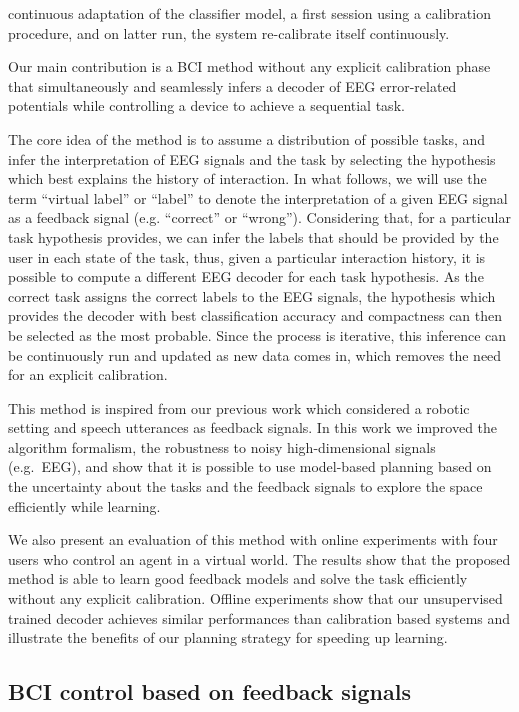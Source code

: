 \cite{schettini2014self} continuous adaptation of the classifier model, a first session using a calibration procedure, and on latter run, the system re-calibrate itself continuously.


Our main contribution is a BCI method without any explicit calibration phase that simultaneously and seamlessly infers a decoder of EEG error-related potentials while controlling a device to achieve a sequential task.

The core idea of the method is to assume a distribution of possible tasks, and infer the interpretation of EEG signals and the task by selecting the hypothesis which best explains the history of interaction. In what follows, we will use the term ``virtual label'' or ``label'' to denote the interpretation of a given EEG signal as a feedback signal (e.g. ``correct'' or ``wrong''). Considering that, for a particular task hypothesis provides, we can infer the labels that should be provided by the user in each state of the task, thus, given a particular interaction history, it is possible to compute a different EEG decoder for each task hypothesis. As the correct task assigns the correct labels to the EEG signals, the hypothesis which provides the decoder with best classification accuracy and compactness can then be selected as the most probable. Since the process is iterative, this inference can be continuously run and updated as new data comes in, which removes the need for an explicit calibration.

This method is inspired from our previous work \cite{grizou2013robot} which considered a robotic setting and speech utterances as feedback signals. In this work we improved the algorithm formalism, the robustness to noisy high-dimensional signals (e.g.\ EEG), and show that it is possible to use model-based planning based on the uncertainty about the tasks and the feedback signals to explore the space efficiently while learning.

We also present an evaluation of this method with online experiments with four users who control an agent in a virtual world. The results show that the proposed method is able to learn good feedback models and solve the task efficiently without any explicit calibration. Offline experiments show that our unsupervised trained decoder achieves similar performances than calibration based systems and illustrate the benefits of our planning strategy for speeding up learning.

\subsection{BCI control based on feedback signals}

